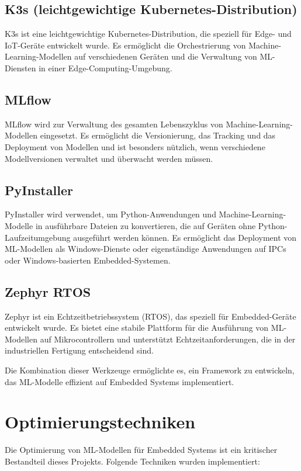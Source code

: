 \subsection{K3s (leichtgewichtige Kubernetes-Distribution)}
K3s ist eine leichtgewichtige Kubernetes-Distribution, die speziell für Edge- und IoT-Geräte entwickelt wurde. Es ermöglicht die Orchestrierung von 
Machine-Learning-Modellen auf verschiedenen Geräten und die Verwaltung von ML-Diensten in einer Edge-Computing-Umgebung.

\subsection{MLflow}
MLflow wird zur Verwaltung des gesamten Lebenszyklus von Machine-Learning-Modellen eingesetzt. Es ermöglicht die Versionierung, das Tracking und das 
Deployment von Modellen und ist besonders nützlich, wenn verschiedene Modellversionen verwaltet und überwacht werden müssen.

\subsection{PyInstaller}
PyInstaller wird verwendet, um Python-Anwendungen und Machine-Learning-Modelle in ausführbare Dateien zu konvertieren, die auf Geräten ohne 
Python-Laufzeitumgebung ausgeführt werden können. Es ermöglicht das Deployment von ML-Modellen als Windows-Dienste oder eigenständige Anwendungen 
auf IPCs oder Windows-basierten Embedded-Systemen.

\subsection{Zephyr RTOS}
Zephyr ist ein Echtzeitbetriebssystem (RTOS), das speziell für Embedded-Geräte entwickelt wurde. Es bietet eine stabile Plattform für die Ausführung 
von ML-Modellen auf Mikrocontrollern und unterstützt Echtzeitanforderungen, die in der industriellen Fertigung entscheidend sind.

Die Kombination dieser Werkzeuge ermöglichte es, ein Framework zu entwickeln, das ML-Modelle effizient auf Embedded Systems implementiert.

\section{Optimierungstechniken}

Die Optimierung von ML-Modellen für Embedded Systems ist ein kritischer Bestandteil dieses Projekts. Folgende Techniken wurden implementiert:

